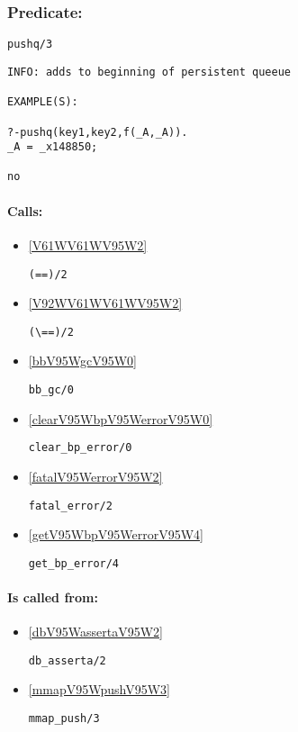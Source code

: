 \subsubsection{Predicate:} \label{pushqV95W3}

\begin{verbatim}
pushq/3
\end{verbatim}

{\small \begin{verbatim}
INFO: adds to beginning of persistent queeue

EXAMPLE(S):

?-pushq(key1,key2,f(_A,_A)).
_A = _x148850;

no

\end{verbatim}}
\paragraph{Calls:} 
\begin{itemize}
\item \ref{V61WV61WV95W2} 
\begin{verbatim}
(==)/2
\end{verbatim}

\item \ref{V92WV61WV61WV95W2} 
\begin{verbatim}
(\==)/2
\end{verbatim}

\item \ref{bbV95WgcV95W0} 
\begin{verbatim}
bb_gc/0
\end{verbatim}

\item \ref{clearV95WbpV95WerrorV95W0} 
\begin{verbatim}
clear_bp_error/0
\end{verbatim}

\item \ref{fatalV95WerrorV95W2} 
\begin{verbatim}
fatal_error/2
\end{verbatim}

\item \ref{getV95WbpV95WerrorV95W4} 
\begin{verbatim}
get_bp_error/4
\end{verbatim}

\end{itemize}
\paragraph{Is called from:} 
\begin{itemize}
\item \ref{dbV95WassertaV95W2} 
\begin{verbatim}
db_asserta/2
\end{verbatim}

\item \ref{mmapV95WpushV95W3} 
\begin{verbatim}
mmap_push/3
\end{verbatim}

\end{itemize}

